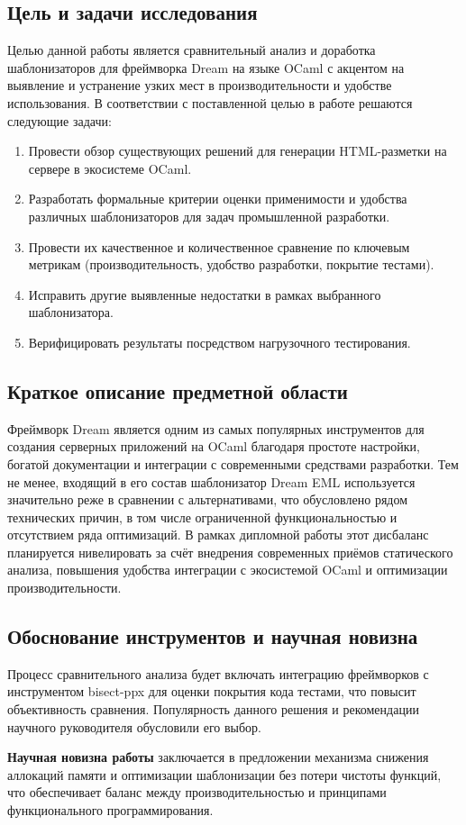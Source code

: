 \subsection*{Цель и задачи исследования} Целью данной работы является сравнительный анализ и доработка шаблонизаторов для фреймворка Dream на языке OCaml с акцентом на выявление и устранение узких мест в производительности и удобстве использования.
В соответствии с поставленной целью в работе решаются следующие задачи:
\begin{enumerate}
    \item Провести обзор существующих решений для генерации HTML-разметки на сервере в экосистеме OCaml.
    \item Разработать формальные критерии оценки применимости и удобства различных шаблонизаторов для задач промышленной разработки.
    \item Провести их качественное и количественное сравнение по ключевым метрикам (производительность, удобство разработки, покрытие тестами).
    \item Исправить другие выявленные недостатки в рамках выбранного шаблонизатора.
    \item Верифицировать результаты посредством нагрузочного тестирования.
\end{enumerate}

\subsection*{Краткое описание предметной области}
Фреймворк Dream является одним из самых популярных инструментов для создания серверных приложений на OCaml благодаря простоте настройки, богатой документации и интеграции с современными средствами разработки.
Тем не менее, входящий в его состав шаблонизатор Dream EML используется значительно реже в сравнении с альтернативами, что обусловлено рядом технических причин, в том числе ограниченной функциональностью и отсутствием ряда оптимизаций.
В рамках дипломной работы этот дисбаланс планируется нивелировать за счёт внедрения современных приёмов статического анализа, повышения удобства интеграции с экосистемой OCaml и оптимизации производительности.

\subsection*{Обоснование инструментов и научная новизна}
Процесс сравнительного анализа будет включать интеграцию фреймворков с инструментом bisect-ppx для оценки покрытия кода тестами, что повысит объективность сравнения.
Популярность данного решения и рекомендации научного руководителя обусловили его выбор.

\textbf{Научная новизна работы} заключается в предложении механизма снижения аллокаций памяти и оптимизации шаблонизации без потери чистоты функций, что обеспечивает баланс между производительностью и принципами функционального программирования.

